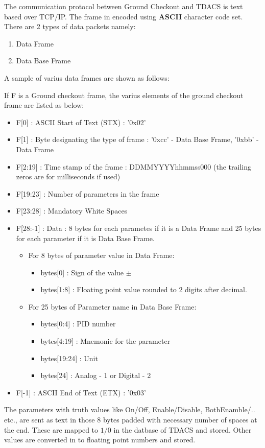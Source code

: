 \par The communication protocol between Ground Checkout and TDACS is text based
over TCP/IP. The frame in encoded using \textbf{ASCII} character code set.
There are 2 types of data packets namely:

\begin{enumerate}
	\item Data Frame
	\item Data Base Frame
\end{enumerate}
A sample of varius data frames are shown as follows:

\newpage
If F is a Ground checkout frame, the varius elements of the ground checkout
frame are listed as below:


\begin{itemize}
	\item F[0] : ASCII Start of Text (STX) : '0x02'
	\item F[1] : Byte designating the type of frame : '0xcc' - Data Base Frame,
		'0xbb' - Data Frame
	\item F[2:19] : Time stamp of the frame :  DDMMYYYYhhmmss000 (the trailing
		zeros are for milliseconds if used)
	\item F[19:23] : Number of parameters in the frame
	\item F[23:28] : Mandatory White Spaces
	\item F[28:-1] : Data : 8 bytes for each parametes if it is a Data Frame
		and 25 bytes for each parameter if it is Data Base Frame.
		\begin{itemize}
			\item For 8 bytes of parameter value in Data Frame:
				\begin{itemize}
					\item bytes[0] : Sign of the value $\pm$
					\item bytes[1:8] : Floating point value rounded to 2
						digits after decimal.
				\end{itemize}
			\item For 25 bytes of Parameter name in Data Base Frame:
				\begin{itemize}
					\item bytes[0:4] : PID number
					\item bytes[4:19] : Mnemonic for the parameter
					\item bytes[19:24] : Unit
					\item bytes[24] : Analog - 1 or Digital - 2
				\end{itemize}
		\end{itemize}
	\item F[-1] : ASCII End of Text (ETX) : '0x03'
\end{itemize}
\bigskip
The parameters with truth values like On/Off, Enable/Disable, BothEnamble/..
etc., are sent as text in those 8 bytes padded with necessary number of spaces
at the end. These are mapped to $1/0$ in the datbase of TDACS and stored. Other
values are converted in to floating point numbers and stored.
